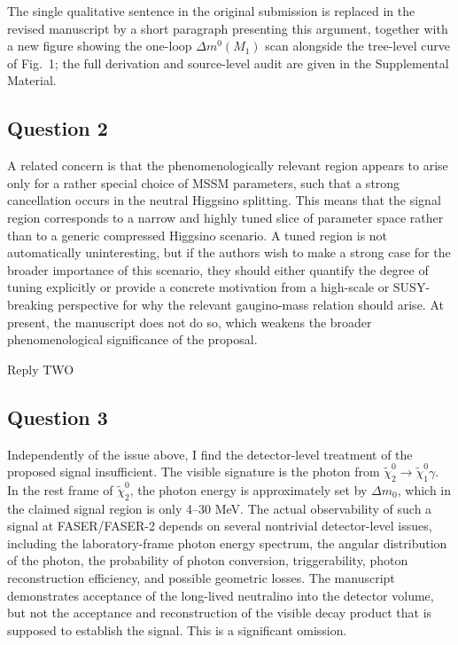 \documentclass{ar2rc}
\begin{document}
The single qualitative sentence in the original submission is replaced in the revised manuscript by a short paragraph presenting this argument, together with a new figure showing the one-loop $\Delta m^0(M_1)$ scan alongside the tree-level curve of Fig.~1; the full derivation and source-level audit are given in the Supplemental Material.

\subsection*{Question 2}
\RC A related concern is that the phenomenologically relevant region appears to arise only for a rather special choice of MSSM parameters, such that a strong cancellation occurs in the neutral Higgsino splitting. This means that the signal region corresponds to a narrow and highly tuned slice of parameter space rather than to a generic compressed Higgsino scenario. A tuned region is not automatically uninteresting, but if the authors wish to make a strong case for the broader importance of this scenario, they should either quantify the degree of tuning explicitly or provide a concrete motivation from a high-scale or SUSY-breaking perspective for why the relevant gaugino-mass relation should arise. At present, the manuscript does not do so, which weakens the broader phenomenological significance of the proposal.

\AR Reply TWO

\subsection*{Question 3}
\RC Independently of the issue above, I find the detector-level treatment of the proposed signal insufficient. The visible signature is the photon from $\tilde{\chi}_2^0 \to \tilde{\chi}_1^0 \gamma$. In the rest frame of $\tilde{\chi}_2^0$, the photon energy is approximately set by $\Delta m_0$, which in the claimed signal region is only 4–30 MeV. The actual observability of such a signal at FASER/FASER-2 depends on several nontrivial detector-level issues, including the laboratory-frame photon energy spectrum, the angular distribution of the photon, the probability of photon conversion, triggerability, photon reconstruction efficiency, and possible geometric losses. The manuscript demonstrates acceptance of the long-lived neutralino into the detector volume, but not the acceptance and reconstruction of the visible decay product that is supposed to establish the signal. This is a significant omission.
\end{document}
